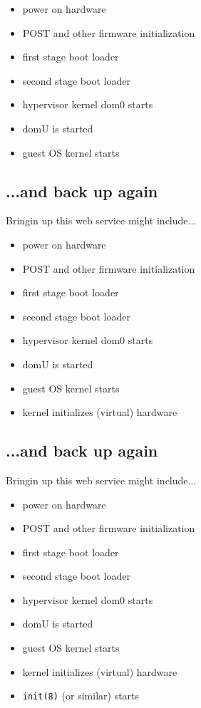 \documentclass[xga]{xdvislides}
\begin{document}
\begin{itemize}
	\item power on hardware
	\item POST and other firmware initialization
	\item first stage boot loader
	\item second stage boot loader
	\item hypervisor kernel dom0 starts
	\item domU is started
	\item guest OS kernel starts
\end{itemize}

\subsection{...and back up again}
Bringin up this web service might include...
\\

\begin{itemize}
	\item power on hardware
	\item POST and other firmware initialization
	\item first stage boot loader
	\item second stage boot loader
	\item hypervisor kernel dom0 starts
	\item domU is started
	\item guest OS kernel starts
	\item kernel initializes (virtual) hardware
\end{itemize}

\subsection{...and back up again}
Bringin up this web service might include...
\\

\begin{itemize}
	\item power on hardware
	\item POST and other firmware initialization
	\item first stage boot loader
	\item second stage boot loader
	\item hypervisor kernel dom0 starts
	\item domU is started
	\item guest OS kernel starts
	\item kernel initializes (virtual) hardware
	\item {\tt init(8)} (or similar) starts
\end{itemize}
\end{document}
